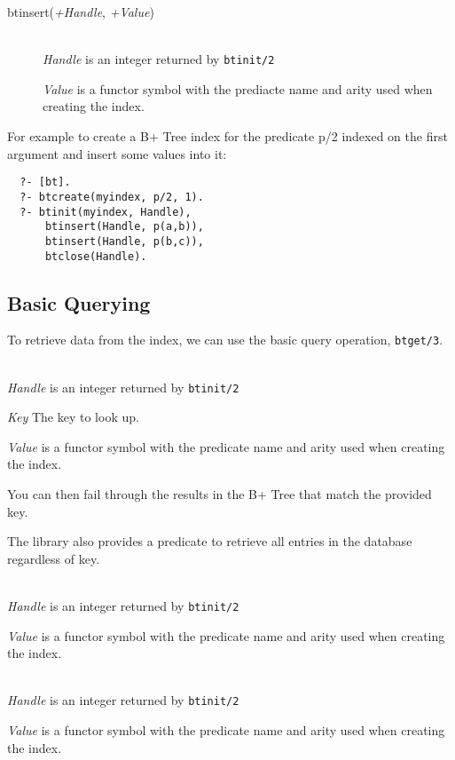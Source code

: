 \begin{description}

\item[btinsert({\it +Handle}, {\it +Value})]\mbox{}
  \\
    {\it Handle} is an integer returned by {\tt btinit/2}

    {\it Value} is a functor symbol with the prediacte name and arity used when creating the index.

\end{description}

For example to create a B+ Tree index for the predicate p/2 indexed on the first argument and insert some values into it:
\begin{verbatim}
  ?- [bt].
  ?- btcreate(myindex, p/2, 1). 
  ?- btinit(myindex, Handle), 
      btinsert(Handle, p(a,b)), 
      btinsert(Handle, p(b,c)), 
      btclose(Handle).
\end{verbatim}
\subsection{Basic Querying}

To retrieve data from the index, we can use the basic query operation, {\tt btget/3}.

\begin{description}

\item[btget({\it +Handle}, {\it +Key}, {\it -Value})]\mbox{}
  \\
    {\it Handle} is an integer returned by {\tt btinit/2}

    {\it Key} The key to look up.

    {\it Value} is a functor symbol with the predicate name and arity used when creating the index.

\end{description}

You can then fail through the results in the B+ Tree that match the provided key.

The library also provides a predicate to retrieve all entries in the database regardless of key.

\begin{description}

  \item[btgetall({\it +Handle}, {\it -Value})]\mbox{}
  \\
    {\it Handle} is an integer returned by {\tt btinit/2}

    {\it Value} is a functor symbol with the predicate name and arity used when creating the index.

  \item[btgetall\_rev({\it +Handle}, {\it -Value})]\mbox{}
  \\
    {\it Handle} is an integer returned by {\tt btinit/2}

    {\it Value} is a functor symbol with the predicate name and arity used when creating the index.

\end{description}

